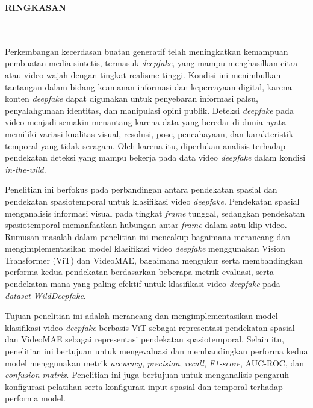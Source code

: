 \clearpage
{}%
\thispagestyle{fancy}

\begin{center}
	\large \bfseries \MakeUppercase{Ringkasan}\\
	\normalsize \normalfont {\thetitle}\\
	\normalsize \normalfont {\theauthor}\\
	\bigskip
	
	\normalsize \normalfont \justifying
	Perkembangan kecerdasan buatan generatif telah meningkatkan kemampuan pembuatan media sintetis, termasuk \textit{deepfake}, yang mampu menghasilkan citra atau video wajah dengan tingkat realisme tinggi. Kondisi ini menimbulkan tantangan dalam bidang keamanan informasi dan kepercayaan digital, karena konten \textit{deepfake} dapat digunakan untuk penyebaran informasi palsu, penyalahgunaan identitas, dan manipulasi opini publik. Deteksi \textit{deepfake} pada video menjadi semakin menantang karena data yang beredar di dunia nyata memiliki variasi kualitas visual, resolusi, pose, pencahayaan, dan karakteristik temporal yang tidak seragam. Oleh karena itu, diperlukan analisis terhadap pendekatan deteksi yang mampu bekerja pada data video \textit{deepfake} dalam kondisi \textit{in-the-wild}. \par

	Penelitian ini berfokus pada perbandingan antara pendekatan spasial dan pendekatan spasiotemporal untuk klasifikasi video \textit{deepfake}. Pendekatan spasial menganalisis informasi visual pada tingkat \textit{frame} tunggal, sedangkan pendekatan spasiotemporal memanfaatkan hubungan antar-\textit{frame} dalam satu klip video. Rumusan masalah dalam penelitian ini mencakup bagaimana merancang dan mengimplementasikan model klasifikasi video \textit{deepfake} menggunakan Vision Transformer (ViT) dan VideoMAE, bagaimana mengukur serta membandingkan performa kedua pendekatan berdasarkan beberapa metrik evaluasi, serta pendekatan mana yang paling efektif untuk klasifikasi video \textit{deepfake} pada \textit{dataset} \textit{WildDeepfake}. \par

	Tujuan penelitian ini adalah merancang dan mengimplementasikan model klasifikasi video \textit{deepfake} berbasis ViT sebagai representasi pendekatan spasial dan VideoMAE sebagai representasi pendekatan spasiotemporal. Selain itu, penelitian ini bertujuan untuk mengevaluasi dan membandingkan performa kedua model menggunakan metrik \textit{accuracy}, \textit{precision}, \textit{recall}, \textit{F1-score}, AUC-ROC, dan \textit{confusion matrix}. Penelitian ini juga bertujuan untuk menganalisis pengaruh konfigurasi pelatihan serta konfigurasi input spasial dan temporal terhadap performa model. \par


\end{center}
